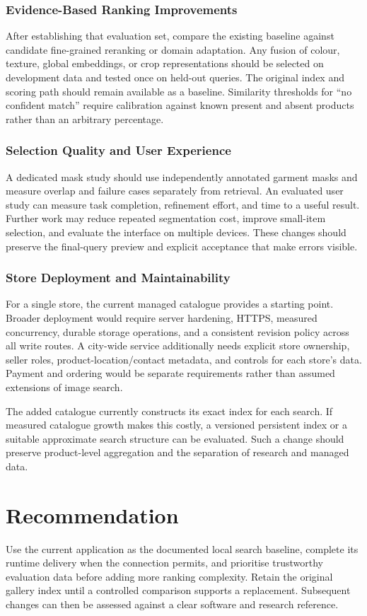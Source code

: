 \subsubsection{Evidence-Based Ranking Improvements}
After establishing that evaluation set, compare the existing baseline against
candidate fine-grained reranking or domain adaptation. Any fusion of colour,
texture, global embeddings, or crop representations should be selected on
development data and tested once on held-out queries. The original index and
scoring path should remain available as a baseline. Similarity thresholds for
``no confident match'' require calibration against known present and absent
products rather than an arbitrary percentage.

\subsubsection{Selection Quality and User Experience}
A dedicated mask study should use independently annotated garment masks and
measure overlap and failure cases separately from retrieval. An evaluated
user study can measure task completion, refinement effort, and time to a useful
result. Further work may reduce repeated segmentation cost, improve small-item
selection, and evaluate the interface on multiple devices. These changes should
preserve the final-query preview and explicit acceptance that make errors visible.

\subsubsection{Store Deployment and Maintainability}
For a single store, the current managed catalogue provides a starting point.
Broader deployment would require server hardening, HTTPS, measured concurrency,
durable storage operations, and a consistent revision policy across all write
routes. A city-wide service additionally needs explicit store ownership,
seller roles, product-location/contact metadata, and controls for each store's
data. Payment and ordering would be separate requirements rather than assumed
extensions of image search.

The added catalogue currently constructs its exact index for each search.
If measured catalogue growth makes this costly, a versioned persistent index
or a suitable approximate search structure can be evaluated. Such a change
should preserve product-level aggregation and the separation of research and
managed data.

\section{Recommendation}
Use the current application as the documented local search baseline, complete
its runtime delivery when the connection permits, and prioritise trustworthy
evaluation data before adding more ranking complexity. Retain the original
gallery index until a controlled comparison supports a replacement. Subsequent
changes can then be assessed against a clear software and research reference.
